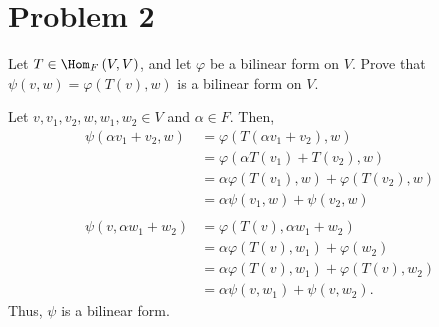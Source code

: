 \documentclass[10pt]{mypackage}
\begin{document}
\section{Problem 2}%
\begin{problem}
  Let $T \in \Hom_{F}\left(V,V\right)$, and let $\varphi$ be a bilinear form on $V$. Prove that $\psi\left(v,w\right) = \varphi\left(T(v),w\right)$ is a bilinear form on $V$.
\end{problem}
\begin{solution}
  Let $v,v_1,v_2,w,w_1,w_2\in V$ and $\alpha\in F$. Then,
  \begin{align*}
    \psi\left(\alpha v_1 + v_2,w\right) &= \varphi\left(T\left(\alpha v_1 + v_2\right),w\right)\\
                                        &= \varphi\left(\alpha T\left(v_1\right) + T\left(v_2\right),w\right)\\
                                        &= \alpha\varphi\left(T\left(v_1\right),w\right) + \varphi\left(T\left(v_2\right),w\right)\\
                                        &= \alpha \psi\left(v_1,w\right) + \psi\left(v_2,w\right)\\
                                        \\
    \psi\left(v,\alpha w_1 + w_2\right) &= \varphi\left(T\left(v\right),\alpha w_1 + w_2 \right)\\
                                        &= \alpha\varphi\left(T\left(v\right),w_1\right) + \varphi\left(w_2\right)\\
                                        &= \alpha \varphi\left(T\left(v\right),w_1\right) + \varphi\left(T\left(v\right),w_2\right)\\
                                        &= \alpha \psi\left(v,w_1\right) + \psi\left(v,w_2\right).
  \end{align*}
  Thus, $\psi$ is a bilinear form.
\end{solution}
\end{document}
